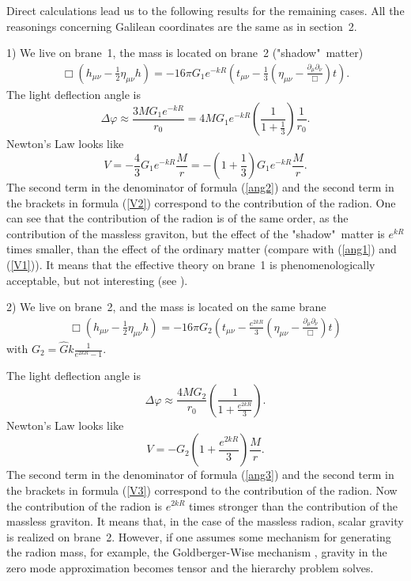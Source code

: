 \documentclass[a4paper,12pt]{article}
\begin{document}
Direct calculations lead us to the following results for the
remaining cases. All the reasonings concerning  Galilean coordinates are
the same as in section~2.

1) We live on brane~1, the mass is located on brane~2 ("shadow"\
matter)
\begin{eqnarray}\label{see}
\Box \left(h_{\mu\nu}-\frac{1}{2}\eta_{\mu\nu}h\right)=-16\pi
G_{1}e^{-kR}\left(t_{\mu\nu}-\frac{1}{3}\left(\eta_{\mu\nu}-\frac{
\partial_\mu\partial_\nu}{\Box}\right)t\right).
\end{eqnarray}
The light deflection angle is
\begin{equation}\label{ang2}
\Delta\varphi\approx\frac{3MG_{1}e^{-kR}}{r_{0}}=4MG_{1}e^{-kR}\left(\frac{1}
{1+\frac{1}{3}}\right)\frac{1}{r_{0}}.
\end{equation}
Newton's Law looks like
\begin{equation}\label{V2}
V=-\frac{4}{3}G_{1}e^{-kR}\frac{M}{r}=-\left(1+\frac{1}{3}\right)G_{1}e^{-kR}\frac{M}{r}.
\end{equation}
The second term in the denominator of formula (\ref{ang2}) and the
second term in the brackets in formula (\ref{V2}) correspond to
the contribution of the radion. One can see that the contribution
of the radion is of the same order, as the contribution of the
massless graviton, but the effect of the "shadow"\ matter is
$e^{kR}$ times smaller, than the effect of the ordinary matter
(compare with (\ref{ang1}) and (\ref{V1})). It means that the
effective theory on brane~1 is phenomenologically acceptable, but
not interesting (see \cite{BKSV}).

2) We live on brane~2, and  the  mass is located on the same brane
\begin{eqnarray}
\Box \left(h_{\mu\nu}-\frac{1}{2}\eta_{\mu\nu}h\right)=-16\pi
G_{2}\left(t_{\mu\nu}-\frac{e^{2kR}}{3}\left(\eta_{\mu\nu}-\frac{
\partial_\mu\partial_\nu}{\Box}\right)t\right)
\end{eqnarray}
with $G_{2}=\hat G k\frac{1}{e^{2kR}-1}$.

The light deflection angle  is
\begin{equation}\label{ang3}
\Delta\varphi\approx\frac{4MG_{2}}{r_{0}}\left(\frac{1}{1+\frac{e^{2kR}}{3}}\right).
\end{equation}
Newton's Law looks like
\begin{equation}\label{V3}
V=-G_{2}\left(1+\frac{e^{2kR}}{3}\right)\frac{M}{r}.
\end{equation}
The second term in the denominator of formula (\ref{ang3}) and the
second term in the brackets in formula (\ref{V3}) correspond to the contribution
of the radion. Now the  contribution of the radion is $e^{2kR}$
times stronger than the contribution of the massless graviton. It
means that, in the case of the massless radion, scalar gravity is
realized on brane~2. However, if one assumes some mechanism for
generating the radion mass, for example, the Goldberger-Wise
mechanism \cite{wise}, gravity in the zero mode approximation
becomes tensor and the hierarchy problem solves.
\end{document}
